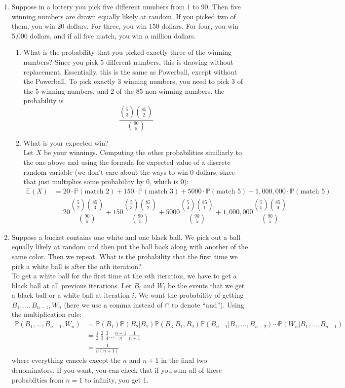 \documentclass[12pt]{article}
\def\P{{\mathbb P}}
\def\E{{\mathbb E}}
\begin{document}
\begin{enumerate}
\item Suppose in a lottery you pick five different numbers from 1 to 90. Then five winning numbers are drawn equally likely at random. If you picked two of them, you win 20 dollars. For three, you win 150 dollars. For four, you win 5,000 dollars, and if all five match, you win a million dollars.
\begin{enumerate}
\item What is the probability that you picked exactly three of the winning numbers?
Since you pick 5 different numbers, this is drawing without replacement. Essentially, this is the same as Powerball, except without the Powerball. To pick exactly 3 winning numbers, you need to pick 3 of the 5 winning numbers, and 2 of the 85 non-winning numbers. the probability is
\[
\dfrac{ \binom{5}{3} \binom{85}{2} }{ \binom{90}{5} }
\]
\item What is your expected win?\\
Let $X$ be your winnings. Computing the other probabilities similiarly to the one above and using the formula for expected value of a discrete random variable (we don't care about the ways to win 0 dollars, since that just multiplies some probability by 0, which is 0):
\begin{align*}
\E(X) &= 20\cdot\P(\text{match 2}) + 150\cdot\P(\text{match 3}) + 5000\cdot\P(\text{match 5}) + 1,000,000\cdot\P(\text{match 5})\\
&= 20 \dfrac{ \binom{5}{2} \binom{85}{3} }{ \binom{90}{5} } + 150 \dfrac{ \binom{5}{3} \binom{85}{2} }{ \binom{90}{5} } + 5000\dfrac{ \binom{5}{4} \binom{85}{1} }{ \binom{90}{5} } + 1,000,000\dfrac{ \binom{5}{5} \binom{85}{0} }{ \binom{90}{5} }
\end{align*}
\end{enumerate}

\item Suppose a bucket contains one white and one black ball. We pick out a ball equally likely at random and then put the ball back along with another of the same color. Then we repeat. What is the probability that the first time we pick a white ball is after the $n$th iteration?\\

To get a white ball for the first time at the $n$th iteration, we have to get a black ball at all previous iterations. Let $B_i$ and $W_i$ be the events that we get a black ball or a white ball at iteration $i$. We want the probability of getting $B_1, ..., B_{n-1}, W_n$ (here we use a comma instead of $\cap$ to denote ``and''). Using the multiplication rule:
\begin{align*}
\P(B_1, ..., B_{n-1}, W_n) &= \P(B_1)\P(B_2|B_1)\P(B_3|B_1, B_2)\P(B_{n-1}|B_1, \dots, B_{n-2})\cdots \P(W_n|B_1, \dots, B_{n-1}) \\
&= \frac{1}{2} \: \frac{2}{3} \: \frac{3}{4} \dots \frac{n-1}{n} \:\frac{1}{n+1} \\
&= \frac{1}{n(n+1)}
\end{align*}
where everything cancels except the $n$ and $n+1$ in the final two denominators. If you want, you can check that if you sum all of these probabilties from $n = 1$ to infinity, you get 1.

\end{enumerate}
\end{document}
